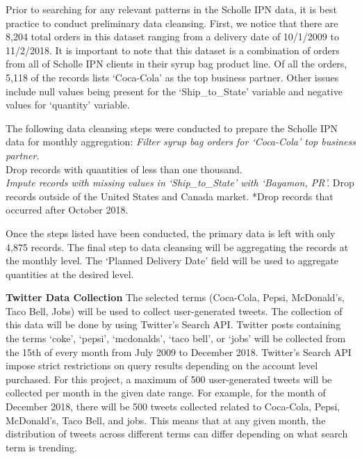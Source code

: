 \documentclass[12pt,oneside]{chicagocapstone}
\begin{document}
Prior to searching for any relevant patterns in the Scholle IPN data, it
is best practice to conduct preliminary data cleansing. First, we notice
that there are 8,204 total orders in this dataset ranging from a
delivery date of 10/1/2009 to 11/2/2018. It is important to note that
this dataset is a combination of orders from all of Scholle IPN clients
in their syrup bag product line. Of all the orders, 5,118 of the records
lists `Coca-Cola' as the top business partner. Other issues include null
values being present for the `Ship\_to\_State' variable and negative
values for `quantity' variable.

The following data cleansing steps were conducted to prepare the Scholle
IPN data for monthly aggregation: \emph{Filter syrup bag orders for
`Coca-Cola' top business partner.\\
}Drop records with quantities of less than one thousand.\\
\emph{Impute records with missing values in `Ship\_to\_State' with
`Bayamon, PR'. }Drop records outside of the United States and Canada
market. *Drop records that occurred after October 2018.

Once the steps listed have been conducted, the primary data is left with
only 4,875 records. The final step to data cleansing will be aggregating
the records at the monthly level. The `Planned Delivery Date' field will
be used to aggregate quantities at the desired level.

\textbf{Twitter Data Collection} The selected terms (Coca-Cola, Pepsi,
McDonald's, Taco Bell, Jobs) will be used to collect user-generated
tweets. The collection of this data will be done by using Twitter's
Search API. Twitter posts containing the terms `coke', `pepsi',
`mcdonalds', `taco bell', or `jobs' will be collected from the 15th of
every month from July 2009 to December 2018. Twitter's Search API impose
strict restrictions on query results depending on the account level
purchased. For this project, a maximum of 500 user-generated tweets will
be collected per month in the given date range. For example, for the
month of December 2018, there will be 500 tweets collected related to
Coca-Cola, Pepsi, McDonald's, Taco Bell, and jobs. This means that at
any given month, the distribution of tweets across different terms can
differ depending on what search term is trending.
\end{document}
